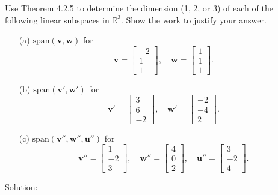 Use Theorem 4.2.5 to determine the dimension (1, 2, or 3) of each of the following linear subspaces in $\mathbb{R}^3$. Show the work to justify your answer.

\begin{enumerate}
    \item[(a)] $\text{span}(\mathbf{v}, \mathbf{w})$ for 
    \[
    \mathbf{v} =
    \begin{bmatrix}
    -2 \\ 1 \\ 1
    \end{bmatrix},
    \quad
    \mathbf{w} =
    \begin{bmatrix}
    1 \\ 1 \\ 1
    \end{bmatrix}.
    \]
    \item[(b)] $\text{span}(\mathbf{v'}, \mathbf{w'})$ for 
    \[
    \mathbf{v'} =
    \begin{bmatrix}
    3 \\ 6 \\ -2
    \end{bmatrix},
    \quad
    \mathbf{w'} =
    \begin{bmatrix}
    -2 \\ -4 \\ 2
    \end{bmatrix}.
    \]
    \item[(c)] $\text{span}(\mathbf{v''}, \mathbf{w''},\mathbf{u''})$ for 
    \[
    \mathbf{v''} =
    \begin{bmatrix}
    1 \\ -2 \\ 3
    \end{bmatrix},
    \quad
    \mathbf{w''} =
    \begin{bmatrix}
    4 \\ 0 \\ 2
    \end{bmatrix},
    \quad
    \mathbf{u''} =
    \begin{bmatrix}
    3 \\ -2 \\ 4
    \end{bmatrix}.
    \]
\end{enumerate}

Solution:

